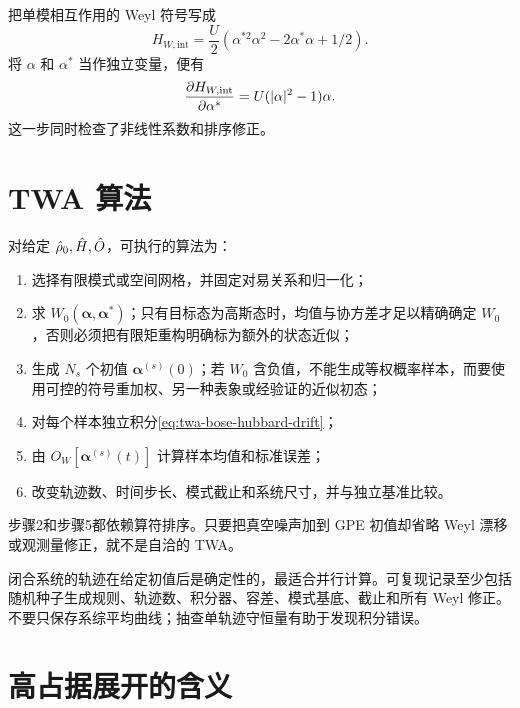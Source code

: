 \begin{derivationbox}
把单模相互作用的 Weyl 符号写成
\[
  H_{W,\mathrm{int}}=\frac{U}{2}
  (\alpha^{*2}\alpha^2-2\alpha^*\alpha+1/2).
\]
将 $\alpha$ 和 $\alpha^*$ 当作独立变量，便有
\[
  \frac{\partial H_{W,\mathrm{int}}}{\partial \alpha^*}
  =U(|\alpha|^2-1)\alpha.
\]
这一步同时检查了非线性系数和排序修正。
\end{derivationbox}

\section{TWA 算法}

对给定 $\hat\rho_0,\hat H,\hat O$，可执行的算法为：
\begin{enumerate}
  \item 选择有限模式或空间网格，并固定对易关系和归一化；
  \item 求 $W_0(\bm\alpha,\bm\alpha^*)$；只有目标态为高斯态时，均值与协方差才足以精确确定 $W_0$，否则必须把有限矩重构明确标为额外的状态近似；
  \item 生成 $N_s$ 个初值 $\bm\alpha^{(s)}(0)$；若 $W_0$ 含负值，不能生成等权概率样本，而要使用可控的符号重加权、另一种表象或经验证的近似初态；
  \item 对每个样本独立积分\cref{eq:twa-bose-hubbard-drift}；
  \item 由 $O_W[\bm\alpha^{(s)}(t)]$ 计算样本均值和标准误差；
  \item 改变轨迹数、时间步长、模式截止和系统尺寸，并与独立基准比较。
\end{enumerate}
步骤2和步骤5都依赖算符排序。只要把真空噪声加到 GPE 初值却省略 Weyl 漂移或观测量修正，就不是自洽的 TWA。

\begin{numericalbox}
闭合系统的轨迹在给定初值后是确定性的，最适合并行计算。可复现记录至少包括随机种子生成规则、轨迹数、积分器、容差、模式基底、截止和所有 Weyl 修正。不要只保存系综平均曲线；抽查单轨迹守恒量有助于发现积分错误。
\end{numericalbox}

\section{高占据展开的含义}

